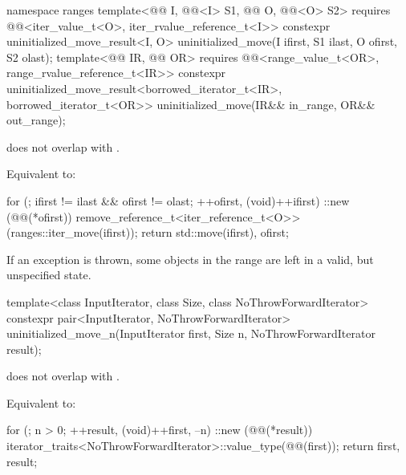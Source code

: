 %
\begin{itemdecl}
namespace ranges {
  template<@@ I, @@<I> S1,
           @@ O, @@<O> S2>
    requires @@<iter_value_t<O>, iter_rvalue_reference_t<I>>
    constexpr uninitialized_move_result<I, O>
      uninitialized_move(I ifirst, S1 ilast, O ofirst, S2 olast);
  template<@@ IR, @@ OR>
    requires @@<range_value_t<OR>, range_rvalue_reference_t<IR>>
    constexpr uninitialized_move_result<borrowed_iterator_t<IR>, borrowed_iterator_t<OR>>
      uninitialized_move(IR&& in_range, OR&& out_range);
}
\end{itemdecl}

\begin{itemdescr}
\pnum
\expects
{} does not overlap with .

\pnum
\effects
Equivalent to:
\begin{codeblock}
for (; ifirst != ilast && ofirst != olast; ++ofirst, (void)++ifirst)
  ::new (@@(*ofirst))
    remove_reference_t<iter_reference_t<O>>(ranges::iter_move(ifirst));
return {std::move(ifirst), ofirst};
\end{codeblock}

\pnum
\begin{note}
If an exception is thrown, some objects in the range  are
left in a valid, but unspecified state.
\end{note}
\end{itemdescr}

%
\begin{itemdecl}
template<class InputIterator, class Size, class NoThrowForwardIterator>
  constexpr pair<InputIterator, NoThrowForwardIterator>
    uninitialized_move_n(InputIterator first, Size n, NoThrowForwardIterator result);
\end{itemdecl}

\begin{itemdescr}
\pnum
\expects
{} does not overlap with .

\pnum
\effects
Equivalent to:
\begin{codeblock}
for (; n > 0; ++result, (void)++first, --n)
  ::new (@@(*result))
    iterator_traits<NoThrowForwardIterator>::value_type(@@(first));
return {first, result};
\end{codeblock}
\end{itemdescr}

